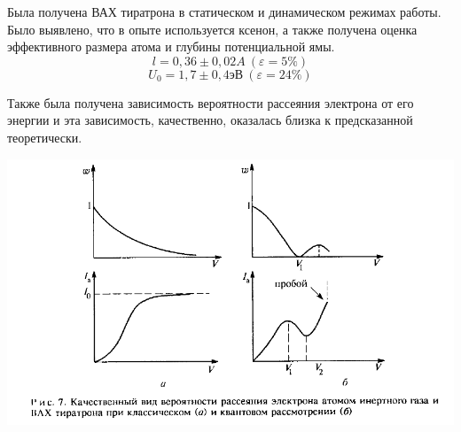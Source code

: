 \documentclass[a4paper,12pt]{article}
\newcommand{\eps}{\varepsilon}
\begin{document}
	Была получена ВАХ тиратрона в статическом и динамическом режимах работы. Было выявлено, что в опыте используется ксенон, а также получена оценка эффективного размера атома и глубины потенциальной ямы. 
		$$l = 0,36 \pm0,02 A\ (\eps = 5\%)$$
	$$U_0 = 1,7 \pm 0,4 \text{эВ} \ (\eps = 24\%)$$
	
	Также была получена зависимость вероятности рассеяния электрона от его энергии и эта зависимость, качественно, оказалась близка к предсказанной теоретически.
	
	\includegraphics[width=\linewidth]{teor.png}
	
	 
\end{document}
